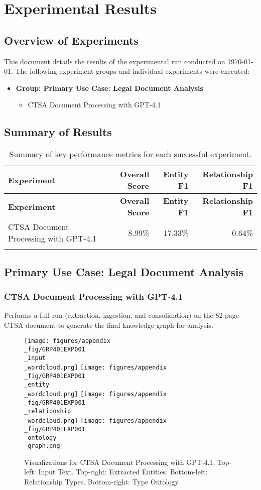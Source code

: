 \chapter{Experimental Results}
\section{Overview of Experiments}
This document details the results of the experimental run conducted on \today.
The following experiment groups and individual experiments were executed:
\begin{itemize}
  \item \textbf{Group: Primary Use Case: Legal Document Analysis}
  \begin{itemize}
    \item CTSA Document Processing with GPT-4.1
  \end{itemize}
\end{itemize}
\section{Summary of Results}
\begin{longtable}{p{}rrr}
\toprule
\textbf{Experiment} & \textbf{Overall Score} & \textbf{Entity F1} & \textbf{Relationship F1} \\
\midrule
\endfirsthead
\toprule
\textbf{Experiment} & \textbf{Overall Score} & \textbf{Entity F1} & \textbf{Relationship F1} \\
\midrule
\endhead
CTSA Document Processing with GPT-4.1 & 8.99\% & 17.33\% & 0.64\% \\
\bottomrule
\caption{Summary of key performance metrics for each successful experiment.}
\end{longtable}
\clearpage
\section{Primary Use Case: Legal Document Analysis}
\subsection{CTSA Document Processing with GPT-4.1}
Performs a full run (extraction, ingestion, and consolidation) on the 82-page CTSA document to generate the final knowledge graph for analysis.

\begin{figure}[!ht]
  \centering
  \texttt{[image: figures/appendix\\\_fig/GRP401EXP001\\\_input\\\_wordcloud.png]}
  \texttt{[image: figures/appendix\\\_fig/GRP401EXP001\\\_entity\\\_wordcloud.png]}
  \texttt{[image: figures/appendix\\\_fig/GRP401EXP001\\\_relationship\\\_wordcloud.png]}
  \texttt{[image: figures/appendix\\\_fig/GRP401EXP001\\\_ontology\\\_graph.png]}
  \caption{Visualizations for CTSA Document Processing with GPT-4.1. Top-left: Input Text. Top-right: Extracted Entities. Bottom-left: Relationship Types. Bottom-right: Type Ontology.}
\end{figure}
\clearpage
